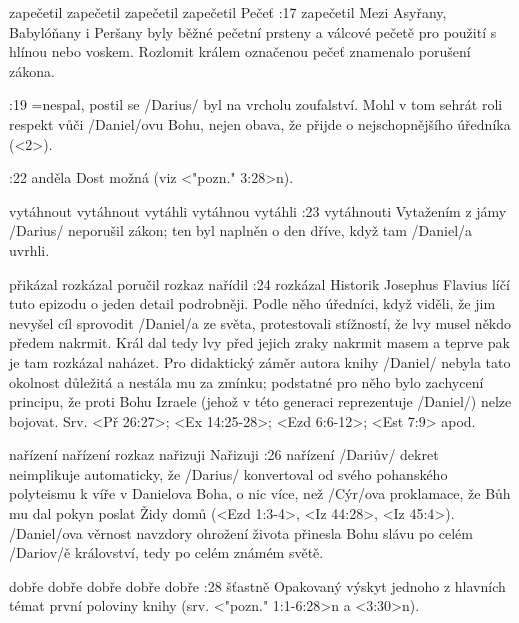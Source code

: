     {zapečetil} %
    {zapečetil}  %
    {zapečetil} %
    {zapečetil}  %
    {Pečeť}  %
:17 {zapečetil} Mezi Asyřany, Babylóňany i Peršany byly běžné pečetní prsteny a válcové pečetě pro použití s hlínou nebo voskem. Rozlomit králem označenou pečeť znamenalo porušení zákona.

:19 {}={nespal, postil se} \x/Darius/ byl na vrcholu zoufalství. Mohl v tom sehrát roli respekt vůči \x/Daniel/ovu Bohu, nejen obava, že přijde o nejschopnějšího úředníka (<2>).     

:22 {anděla}  Dost možná   (viz <"pozn." 3:28>n).

    {vytáhnout}  %
    {vytáhnout}  %
    {vytáhli}  %
    {vytáhnou}  %
    {vytáhli}  %
:23 {vytáhnouti} Vytažením z jámy \x/Darius/ neporušil zákon; ten byl naplněn o den dříve, když tam \x/Daniel/a uvrhli. 

    {přikázal}  %
    {rozkázal}  %
    {poručil}  %
    {rozkaz}  %
    {nařídil}  %
:24 {rozkázal} Historik Josephus Flavius líčí tuto epizodu o jeden detail podrobněji. Podle něho úředníci, když viděli, že jim nevyšel cíl sprovodit \x/Daniel/a ze světa, protestovali stížností, že lvy musel někdo předem nakrmit. Král dal tedy lvy před jejich zraky nakrmit masem a teprve pak je tam rozkázal naházet. Pro didaktický záměr autora knihy \x/Daniel/ nebyla tato okolnost důležitá a nestála mu za zmínku; podstatné pro něho bylo zachycení principu, že proti Bohu Izraele (jehož v této generaci reprezentuje \x/Daniel/) nelze bojovat. Srv. <Př 26:27>;  <Ex 14:25-28>; <Ezd 6:6-12>;  <Est 7:9> apod. 

    {nařízení} %
    {nařízení}  %
    {rozkaz} %
    {nařizuji}  %
    {Nařizuji}  %
:26 {nařízení} 
     \x/Dariův/ dekret neimplikuje automaticky, že \x/Darius/ konvertoval od svého
     pohanského polyteismu k víře v Danielova Boha, o nic více, než \x/Cýr/ova proklamace, že Bůh mu dal pokyn poslat Židy domů (<Ezd 1:3-4>, <Iz 44:28>, <Iz 45:4>).
     \x/Daniel/ova věrnost navzdory ohrožení života přinesla Bohu slávu po celém \x/Dariov/ě království, tedy po celém známém světě.  

    {dobře}  %
    {dobře}  %
    {dobře}  %
    {dobře}  %
    {dobře}  %
:28 {šťastně} Opakovaný výskyt jednoho z hlavních témat první poloviny knihy  (srv. <"pozn." 1:1-6:28>n a <3:30>n).     

